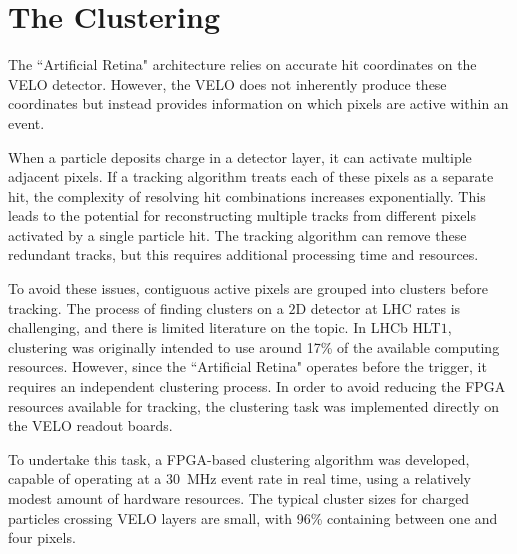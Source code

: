 
\section{The Clustering}

The ``Artificial Retina" architecture relies on accurate hit coordinates on the VELO detector. However, the VELO does not inherently produce these coordinates but instead provides information on which pixels are active within an event. 

When a particle deposits charge in a detector layer, it can activate multiple adjacent pixels. If a tracking algorithm treats each of these pixels as a separate hit, the complexity of resolving hit combinations increases exponentially. This leads to the potential for reconstructing multiple tracks from different pixels activated by a single particle hit. The tracking algorithm can remove these redundant tracks, but this requires additional processing time and resources.

To avoid these issues, contiguous active pixels are grouped into clusters before tracking. The process of finding clusters on a $2$D detector at LHC rates is challenging, and there is limited literature on the topic. In LHCb HLT$1$, clustering was originally intended to use around 17\% of the available computing resources. However, since the ``Artificial Retina" operates before the trigger, it requires an independent clustering process. In order to avoid reducing the FPGA resources available for tracking, the clustering task was implemented directly on the VELO readout boards. %

To undertake this task, a FPGA-based clustering algorithm was developed, capable of operating at a \SI{30}{\mega\hertz} event rate in real time, using a relatively modest amount of hardware resources. The typical cluster sizes for charged particles crossing VELO layers are small, with 96\% containing between one and four pixels. 

